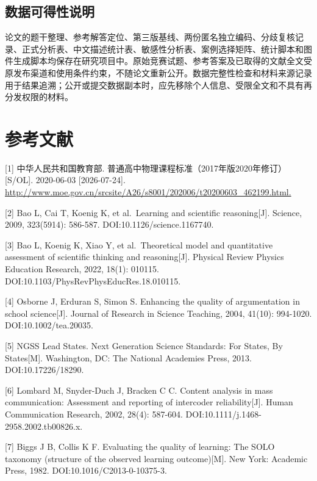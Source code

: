 \documentclass[
  12pt,
  a4paper,twoside,openany]{ctexbook}
\begin{document}
\section{数据可得性说明}\label{ux6570ux636eux53efux5f97ux6027ux8bf4ux660e}

论文的题干整理、参考解答定位、第三版基线、两份匿名独立编码、分歧复核记录、正式分析表、中文描述统计表、敏感性分析表、案例选择矩阵、统计脚本和图件生成脚本均保存在研究项目中。原始竞赛试题、参考答案及已取得的文献全文受原发布渠道和使用条件约束，不随论文重新公开。数据完整性检查和材料来源记录用于结果追溯；公开或提交数据副本时，应先移除个人信息、受限全文和不具有再分发权限的材料。

\chapter*{参考文献}\begingroup\setlength{\leftskip}{2em}\setlength{\parindent}{-2em}\setlength{\parskip}{3pt}\label{ux53c2ux8003ux6587ux732e}

{[}1{]} 中华人民共和国教育部.
普通高中物理课程标准（2017年版2020年修订）{[}S/OL{]}. 2020-06-03
{[}2026-07-24{]}.
\url{http://www.moe.gov.cn/srcsite/A26/s8001/202006/t20200603_462199.html.}

{[}2{]} Bao L, Cai T, Koenig K, et al.~Learning and scientific
reasoning{[}J{]}. Science, 2009, 323(5914): 586-587.
DOI:10.1126/science.1167740.

{[}3{]} Bao L, Koenig K, Xiao Y, et al.~Theoretical model and
quantitative assessment of scientific thinking and reasoning{[}J{]}.
Physical Review Physics Education Research, 2022, 18(1): 010115.
DOI:10.1103/PhysRevPhysEducRes.18.010115.

{[}4{]} Osborne J, Erduran S, Simon S. Enhancing the quality of
argumentation in school science{[}J{]}. Journal of Research in Science
Teaching, 2004, 41(10): 994-1020. DOI:10.1002/tea.20035.

{[}5{]} NGSS Lead States. Next Generation Science Standards: For States,
By States{[}M{]}. Washington, DC: The National Academies Press, 2013.
DOI:10.17226/18290.

{[}6{]} Lombard M, Snyder-Duch J, Bracken C C. Content analysis in mass
communication: Assessment and reporting of intercoder
reliability{[}J{]}. Human Communication Research, 2002, 28(4): 587-604.
DOI:10.1111/j.1468-2958.2002.tb00826.x.

{[}7{]} Biggs J B, Collis K F. Evaluating the quality of learning: The
SOLO taxonomy (structure of the observed learning outcome){[}M{]}. New
York: Academic Press, 1982. DOI:10.1016/C2013-0-10375-3.
\end{document}
